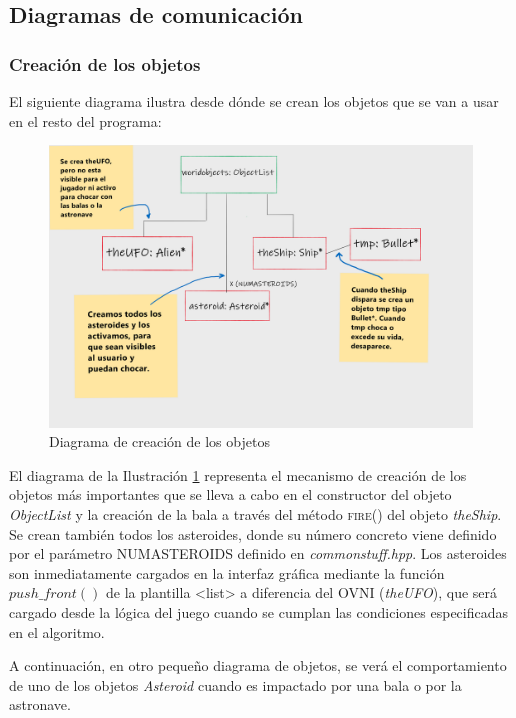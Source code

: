 \subsection{Diagramas de comunicación}
\subsubsection{Creación de los objetos}

El siguiente diagrama ilustra desde dónde se crean los objetos que se van a usar en el resto del programa:

\begin{figure}[H]
    \centering
    \includegraphics[width=\textwidth]{fotos/Creacion.png}
    \caption{Diagrama de creación de los objetos}
    \label{creacion}
\end{figure}

El diagrama de la Ilustración \ref{creacion} representa el mecanismo de creación de los objetos más importantes que se lleva a cabo en el constructor del objeto \emph{ObjectList} y la creación de la bala a través del método \textsc{fire()} del objeto \emph{theShip}. Se crean también todos los asteroides, donde su número concreto viene definido por el parámetro NUMASTEROIDS definido en \emph{commonstuff.hpp}. Los asteroides son inmediatamente cargados en la interfaz gráfica mediante la función $push\_front()$ de la plantilla {\textless list\textgreater} a diferencia del OVNI (\emph{theUFO}), que será cargado desde la lógica del juego cuando se cumplan las condiciones especificadas en el algoritmo.

A continuación, en otro pequeño diagrama de objetos, se verá el comportamiento de uno de los objetos \emph{Asteroid} cuando es impactado por una bala o por la astronave.

